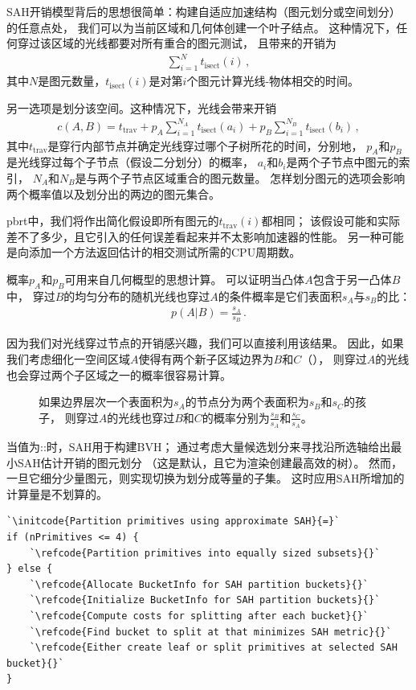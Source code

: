 SAH开销模型背后的思想很简单：构建自适应加速结构（图元划分或空间划分）的任意点处，
我们可以为当前区域和几何体创建一个叶子结点。
这种情况下，任何穿过该区域的光线都要对所有重合的图元测试，
且带来的开销为
\begin{align*}
    \sum\limits_{i=1}^{N}{t_{\mathrm{isect}}(i)}\, ,
\end{align*}
其中$N$是图元数量，$t_{\mathrm{isect}}(i)$是对第$i$个图元计算光线-物体相交的时间。

另一选项是划分该空间。这种情况下，光线会带来开销
\begin{align}\label{eq:4.1}
    c(A,B)=t_{\mathrm{trav}}+p_A\sum\limits_{i=1}^{N_A}{t_\mathrm{isect}(a_i)}+p_B\sum\limits_{i=1}^{N_B}{t_{\mathrm{isect}}(b_i)}\, ,
\end{align}
其中$t_{\mathrm{trav}}$是穿行内部节点并确定光线穿过哪个子树所花的时间，分别地，
$p_A$和$p_B$是光线穿过每个子节点（假设二分划分）的概率，
$a_i$和$b_i$是两个子节点中图元的索引，
$N_A$和$N_B$是与两个子节点区域重合的图元数量。
怎样划分图元的选项会影响两个概率值以及划分出的两边的图元集合。

pbrt中，我们将作出简化假设即所有图元的$t_{\mathrm{trav}}(i)$都相同；
该假设可能和实际差不了多少，且它引入的任何误差看起来并不太影响加速器的性能。
另一种可能是向添加一个方法返回估计的相交测试所需的CPU周期数。

概率$p_A$和$p_B$可用来自几何概型的思想计算。
可以证明当凸体$A$包含于另一凸体$B$中，
穿过$B$的均匀分布的随机光线也穿过$A$的条件概率是它们表面积$s_A$与$s_B$的比：
\begin{align*}
    \displaystyle p(A|B)=\frac{s_A}{s_B}\, .
\end{align*}

因为我们对光线穿过节点的开销感兴趣，我们可以直接利用该结果。
因此，如果我们考虑细化一空间区域$A$使得有两个新子区域边界为$B$和$C$（），
则穿过$A$的光线也会穿过两个子区域之一的概率很容易计算。
\begin{figure}[htbp]
    \centering
    \caption{如果边界层次一个表面积为$s_A$的节点分为两个表面积为$s_B$和$s_C$的孩子，
        则穿过$A$的光线也穿过$B$和$C$的概率分别为$\displaystyle\frac{s_B}{s_A}$和$\displaystyle\frac{s_C}{s_A}$。}
    \label{fig:4.5}
\end{figure}

当值为{\ttfamily{}::}时，SAH用于构建BVH；
通过考虑大量候选划分来寻找沿所选轴给出最小SAH估计开销的图元划分
（这是默认，且它为渲染创建最高效的树）。
然而，一旦它细分少量图元，则实现切换为划分成等量的子集。
这时应用SAH所增加的计算量是不划算的。
\begin{lstlisting}
`\initcode{Partition primitives using approximate SAH}{=}`
if (nPrimitives <= 4) {
    `\refcode{Partition primitives into equally sized subsets}{}`
} else {
    `\refcode{Allocate BucketInfo for SAH partition buckets}{}`
    `\refcode{Initialize BucketInfo for SAH partition buckets}{}`
    `\refcode{Compute costs for splitting after each bucket}{}`
    `\refcode{Find bucket to split at that minimizes SAH metric}{}`
    `\refcode{Either create leaf or split primitives at selected SAH bucket}{}`
}
\end{lstlisting}

